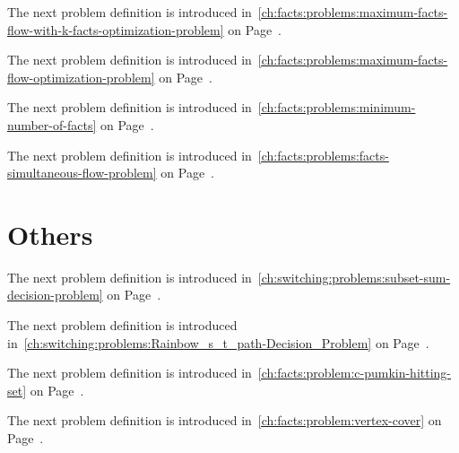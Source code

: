 \gapsizeProblems
The next problem definition is introduced 
in~\cref{ch:facts:problems:maximum-facts-flow-with-k-facts-optimization-problem}
on
Page~\pageref{ch:facts:problems:maximum-facts-flow-with-k-facts-optimization-problem}.
% 


\gapsizeProblems
The next problem definition is introduced 
in~\cref{ch:facts:problems:maximum-facts-flow-optimization-problem}
on
Page~\pageref{ch:facts:problems:maximum-facts-flow-optimization-problem}.
% 


\gapsizeProblems
The next problem definition is introduced
in~\cref{ch:facts:problems:minimum-number-of-facts} on
Page~\pageref{ch:facts:problems:minimum-number-of-facts}.
% 


\gapsizeProblems
The next problem definition is introduced
in~\cref{ch:facts:problems:facts-simultaneous-flow-problem} on
Page~\pageref{ch:facts:problems:facts-simultaneous-flow-problem}.
% 

% 
\section{Others}
\label{app:problems:other:problems}
% 
The next problem definition is introduced
in~\cref{ch:switching:problems:subset-sum-decision-problem} on
Page~\pageref{ch:switching:problems:subset-sum-decision-problem}.
% 


\gapsizeProblems
The next problem definition is introduced
in~\cref{ch:switching:problems:Rainbow_s_t_path-Decision_Problem} on
Page~\pageref{ch:switching:problems:Rainbow_s_t_path-Decision_Problem}.
% 


\gapsizeProblems
The next problem definition is introduced
in~\cref{ch:facts:problem:c-pumkin-hitting-set} on
Page~\pageref{ch:facts:problem:c-pumkin-hitting-set}.
% 


\gapsizeProblems
The next problem definition is introduced
in~\cref{ch:facts:problem:vertex-cover} on
Page~\pageref{ch:facts:problem:vertex-cover}.
% 


